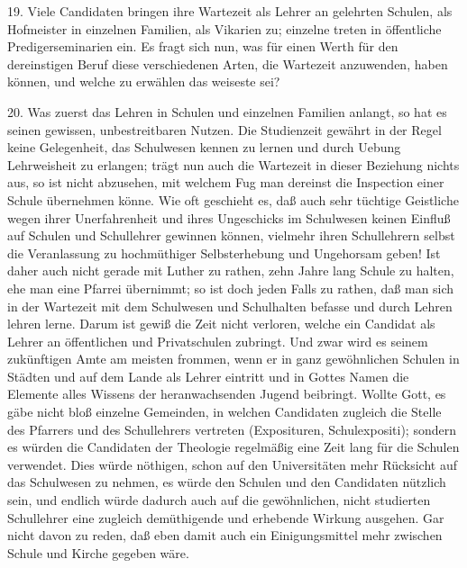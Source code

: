 19. Viele Candidaten bringen ihre Wartezeit als Lehrer an gelehrten Schulen, als Hofmeister in einzelnen Familien, als Vikarien zu; einzelne treten in öffentliche Predigerseminarien ein. Es fragt sich nun, was für einen Werth für den dereinstigen Beruf diese verschiedenen Arten, die Wartezeit anzuwenden, haben können, und welche zu erwählen das weiseste sei?

20. Was zuerst das Lehren in Schulen und einzelnen Familien anlangt, so hat es seinen gewissen, unbestreitbaren Nutzen. Die Studienzeit gewährt in der Regel keine Gelegenheit, das Schulwesen kennen zu lernen und durch Uebung Lehrweisheit zu erlangen; trägt nun auch die Wartezeit in dieser Beziehung nichts aus, so ist nicht abzusehen, mit welchem Fug man dereinst die Inspection einer Schule übernehmen könne. Wie oft geschieht es, daß auch sehr tüchtige Geistliche wegen ihrer Unerfahrenheit und ihres
Ungeschicks im Schulwesen keinen Einfluß auf Schulen und Schullehrer gewinnen können, vielmehr ihren Schullehrern selbst die Veranlassung zu hochmüthiger Selbsterhebung und Ungehorsam geben! Ist daher auch nicht gerade mit Luther zu rathen, zehn Jahre lang Schule zu halten, ehe man eine Pfarrei übernimmt; so ist doch jeden Falls zu rathen, daß man sich in der Wartezeit mit dem Schulwesen und Schulhalten befasse und durch Lehren lehren lerne. Darum ist gewiß die Zeit nicht verloren, welche ein Candidat als Lehrer an öffentlichen und Privatschulen zubringt. Und zwar wird es seinem zukünftigen Amte am meisten frommen, wenn er in ganz gewöhnlichen Schulen in Städten und auf dem Lande als Lehrer eintritt und in Gottes Namen die Elemente alles Wissens der heranwachsenden Jugend beibringt. Wollte Gott, es gäbe nicht bloß einzelne Gemeinden, in welchen Candidaten zugleich die Stelle des Pfarrers und des Schullehrers vertreten (Exposituren, Schulexpositi); sondern es würden die Candidaten der Theologie regelmäßig eine Zeit lang für die Schulen verwendet. Dies würde nöthigen, schon auf den Universitäten mehr Rücksicht auf das Schulwesen zu nehmen, es würde den Schulen und den Candidaten nützlich sein, und endlich würde dadurch auch auf die gewöhnlichen, nicht studierten Schullehrer eine zugleich demüthigende und erhebende Wirkung ausgehen. Gar nicht davon zu reden, daß eben damit auch ein Einigungsmittel mehr zwischen Schule und Kirche gegeben wäre.

